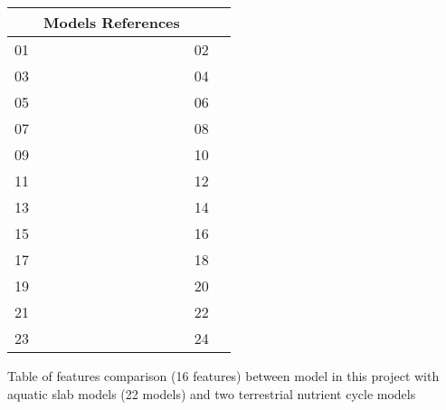 \documentclass[../thesis.tex]{subfiles} %
\begin{document}
\begin{longtable}{}
\end{longtable}
    
\begin{longtable}{p{.05\linewidth}p{.4\linewidth}p{.05\linewidth}p{.4\linewidth}}
    & \textbf{Models References} \\\hline
    01&\autocite{evans1985model} & 02&\autocite{frost1987grazing} \\
    03&\autocite{fasham1990nitrogen} &    04&\autocite{robinson1993simulated} \\
    05&\autocite{fasham1995use} & 06&\autocite{matear1995parameter} \\
    07&\autocite{hurtt1996pelagic} & 08&\autocite{xiao1996relative} \\
    09&\autocite{popova1997chaotic} &    10&\autocite{anderson1998modelling} \\
    11&\autocite{spitz1998data} & 12&\autocite{fennel2001testing} \\
    13&\autocite{natvik2001weak} & 14&\autocite{schartau2001parameter} \\
    15&\autocite{spitz2001configuring} &    16&\autocite{ito2002simulation} \\
    17&\autocite{hemmings2004split} & 18&\autocite{onitsuka2005differences} \\
    19&\autocite{findlay2006modelling} & 20&\autocite{mitra2007accounting} \\
    21&\autocite{mitra2009closure} &    22&\autocite{llebot2010role} \\
    23&\autocite{kidston2013phytoplankton} & 24&\autocite{anderson2015empower} \\
\hline\end{longtable}

\setcounter{table}{0}
\begin{table}[H]
    \centering
    \caption[Model features comparison]{Table of features comparison (16 features) between model in this project with aquatic slab models (22 models) and two terrestrial nutrient cycle models}
    \label{modComp}
\end{table}
\end{document}
